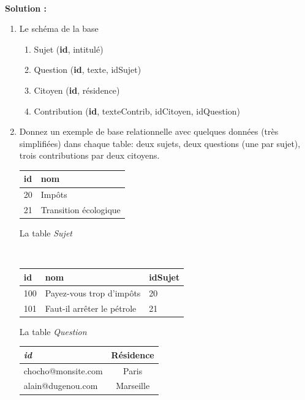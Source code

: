 \documentclass[11pt,a4paper]{article}
\newenvironment{solution}[0]{
~\\ \color{red} \textbf{Solution : }\color{black}}{%
}
\newcommand{\cle}[1]{\textbf{#1}}
\def\fk#1{\textit{#1}}
\def\tble#1{\textit{#1}}
\begin{document}
\begin{solution}

\begin{enumerate}
  \item Le schéma de la base
   \begin{enumerate}
       \item Sujet (\textbf{id}, intitulé)
       \item Question (\textbf{id}, texte, idSujet)
       \item Citoyen (\textbf{id}, résidence)
       \item Contribution (\textbf{id}, texteContrib, idCitoyen, idQuestion)
     \end{enumerate}
     
  \item Donnez un exemple de base relationnelle avec quelques données (très simplifiées) dans chaque table: deux sujets,
      deux questions (une par sujet), trois contributions par deux citoyens. 
      
      
\vspace*{0.2cm}
\begin{minipage}[b]{4cm}
\begin{tabular}{l|l}
\cle{id} & nom\\
\hline
20 & Impôts\\
21 & Transition écologique \\
\hline
\end{tabular}

\centerline{La table \tble{Sujet}}
\end{minipage} \hspace*{0.5cm} \
\begin{minipage}[b]{3cm}
\begin{tabular}{l|l|l}
\cle{id} &  nom  & idSujet\\
\hline
100 & Payez-vous trop d'impôts & 20\\
101 & Faut-il arrêter le pétrole & 21\\
\hline
\end{tabular}
\centerline{La table \tble{Question}}
\end{minipage}

\begin{center}

\begin{tabular}{l|c}
\cle{\fk{id}} & Résidence \\
\hline
chocho@monsite.com  & Paris\\
alain@dugenou.com & Marseille\\
\hline
\end{tabular}



\end{center}
\end{enumerate}
\end{solution}
\end{document}

